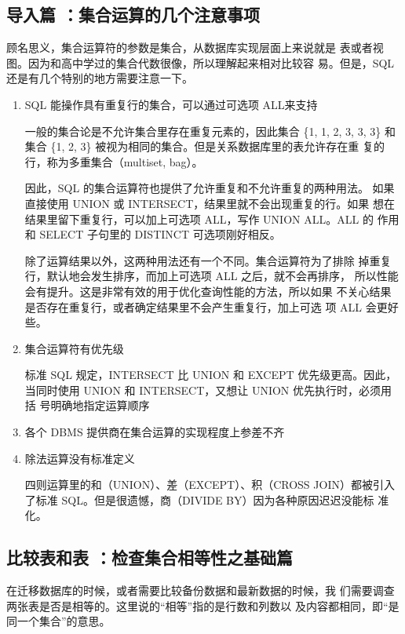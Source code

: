 \subsection{导入篇 ：集合运算的几个注意事项\label{intro17}}
顾名思义，集合运算符的参数是集合，从数据库实现层面上来说就是
表或者视图。因为和高中学过的集合代数很像，所以理解起来相对比较容
易。但是，SQL 还是有几个特别的地方需要注意一下。


\begin{enumerate}
    \item SQL 能操作具有重复行的集合，可以通过可选项 ALL来支持

          一般的集合论是不允许集合里存在重复元素的，因此集合 \{1, 1, 2, 3, 3,
          3\} 和集合 \{1, 2, 3\} 被视为相同的集合。但是关系数据库里的表允许存在重
          复的行，称为多重集合（multiset, bag）。

          因此，SQL 的集合运算符也提供了允许重复和不允许重复的两种用法。
          如果直接使用 UNION 或 INTERSECT，结果里就不会出现重复的行。如果
          想在结果里留下重复行，可以加上可选项 ALL，写作 UNION ALL。ALL 的
          作用和 SELECT 子句里的 DISTINCT 可选项刚好相反。

          除了运算结果以外，这两种用法还有一个不同。集合运算符为了排除
          掉重复行，默认地会发生排序，而加上可选项 ALL 之后，就不会再排序，
          所以性能会有提升。这是非常有效的用于优化查询性能的方法，所以如果
          不关心结果是否存在重复行，或者确定结果里不会产生重复行，加上可选
          项 ALL 会更好些。
    \item 集合运算符有优先级

          标准 SQL 规定，INTERSECT 比 UNION 和 EXCEPT 优先级更高。因此，
          当同时使用 UNION 和 INTERSECT，又想让 UNION 优先执行时，必须用括
          号明确地指定运算顺序
    \item 各个 DBMS 提供商在集合运算的实现程度上参差不齐
    \item 除法运算没有标准定义

          四则运算里的和（UNION）、差（EXCEPT）、积（CROSS JOIN）都被引入了标准 SQL。但是很遗憾，商（DIVIDE BY）因为各种原因迟迟没能标
          准化。
\end{enumerate}

\subsection{比较表和表 ：检查集合相等性之基础篇}
在迁移数据库的时候，或者需要比较备份数据和最新数据的时候，我
们需要调查两张表是否是相等的。这里说的“相等”指的是行数和列数以
及内容都相同，即“是同一个集合”的意思。

